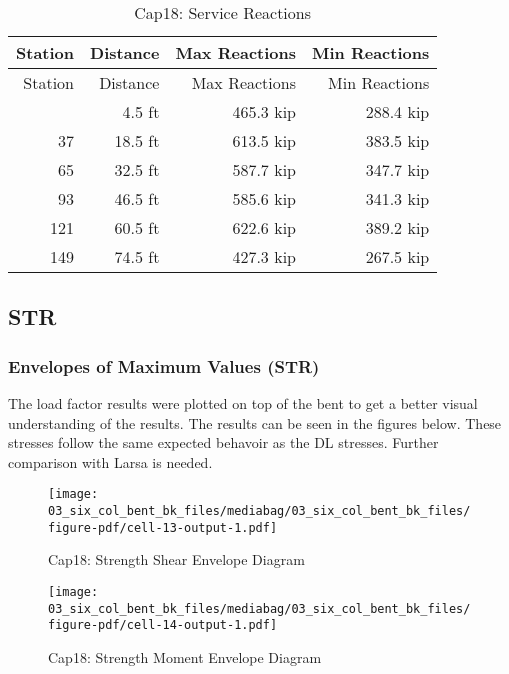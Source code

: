 \documentclass[
  letterpaper,
  DIV=11,
  numbers=noendperiod]{scrartcl}
\begin{document}
\begin{longtable}[]{@{}rrrr@{}}
\caption{Cap18: Service Reactions}\tabularnewline
\toprule\noalign{}
Station & Distance & Max Reactions & Min Reactions \\
\midrule\noalign{}
\endfirsthead
\toprule\noalign{}
Station & Distance & Max Reactions & Min Reactions \\
\midrule\noalign{}
\endhead
\bottomrule\noalign{}
\endlastfoot
9 & 4.5 ft & 465.3 kip & 288.4 kip \\
37 & 18.5 ft & 613.5 kip & 383.5 kip \\
65 & 32.5 ft & 587.7 kip & 347.7 kip \\
93 & 46.5 ft & 585.6 kip & 341.3 kip \\
121 & 60.5 ft & 622.6 kip & 389.2 kip \\
149 & 74.5 ft & 427.3 kip & 267.5 kip \\
\end{longtable}

\newpage{}

\subsection{STR}\label{str}

\subsubsection{Envelopes of Maximum Values
(STR)}\label{envelopes-of-maximum-values-str}

The load factor results were plotted on top of the bent to get a better
visual understanding of the results. The results can be seen in the
figures below. These stresses follow the same expected behavoir as the
DL stresses. Further comparison with Larsa is needed.

\begin{figure}[H]

{\centering \texttt{[image: 03\_six\_col\_bent\_bk\_files/mediabag/03\_six\_col\_bent\_bk\_files/figure-pdf/cell-13-output-1.pdf]}

}

\caption{Cap18: Strength Shear Envelope Diagram}

\end{figure}%

\begin{figure}[H]

{\centering \texttt{[image: 03\_six\_col\_bent\_bk\_files/mediabag/03\_six\_col\_bent\_bk\_files/figure-pdf/cell-14-output-1.pdf]}

}

\caption{Cap18: Strength Moment Envelope Diagram}

\end{figure}%
\end{document}
